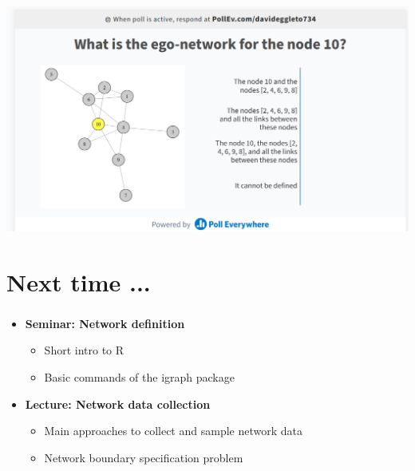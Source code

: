 \documentclass[8pt]{beamer}
\begin{document}

\begin{frame}
\frametitle{\insertsection}
\centering
\includegraphics[width=\linewidth, frame]{poll4}
\end{frame}








\section*{Next time ...}


\bgroup
{}
\begin{frame}[plain]{}
\begin{center}
\color{white}{\Huge\insertsection}
\end{center}
\end{frame}
\egroup


\begin{frame}
\frametitle{\insertsection}

\begin{itemize}
\item 	\textbf{Seminar: Network definition}
	\begin{itemize}
	\item Short intro to R
	\item Basic commands of the igraph package 
	\end{itemize}		
\medskip
\medskip
\item 	\textbf{Lecture: Network data collection}
	\begin{itemize}
	\item Main approaches to collect and sample network data 
	\item Network boundary specification problem
	\end{itemize}


\end{itemize}

\end{frame}
\end{document}
